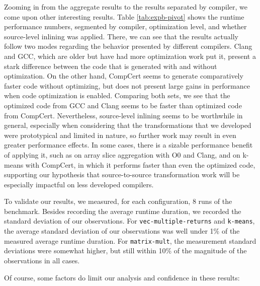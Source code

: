 Zooming in from the aggregate results to the results separated by compiler, we come upon other interesting results. Table \ref{tab:expb-pivot} shows the runtime performance numbers, segmented by compiler, optimization level, and whether source-level inlining was applied. There, we can see that the results actually follow two modes regarding the behavior presented by different compilers. Clang and GCC, which are older but have had more optimization work put it, present a stark difference between the code that is generated with and without optimization. On the other hand, CompCert seems to generate comparatively faster code without optimizing, but does not present large gains in performance when code optimization is enabled. Comparing both sets, we see that the optimized code from GCC and Clang seems to be faster than optimized code from CompCert. Nevertheless, source-level inlining seems to be worthwhile in general, especially when considering that the transformations that we developed were prototypical and limited in nature, so further work may result in even greater performance effects. In some cases, there is a sizable performance benefit of applying it, such as on array slice aggregation with O0 and Clang, and on k-means with CompCert, in which it performs faster than even the optimized code, supporting our hypothesis that source-to-source transformation work will be especially impactful on less developed compilers.

To validate our results, we measured, for each configuration, 8 runs of the benchmark. Besides recording the average runtime duration, we recorded the standard deviation of our observations. For \texttt{vec-multiple-returns} and \texttt{k-means}, the average standard deviation of our observations was well under 1\% of the measured average runtime duration. For \texttt{matrix-mult}, the measurement standard deviations were somewhat higher, but still within 10\% of the magnitude of the observations in all cases.

Of course, some factors do limit our analysis and confidence in these results:

